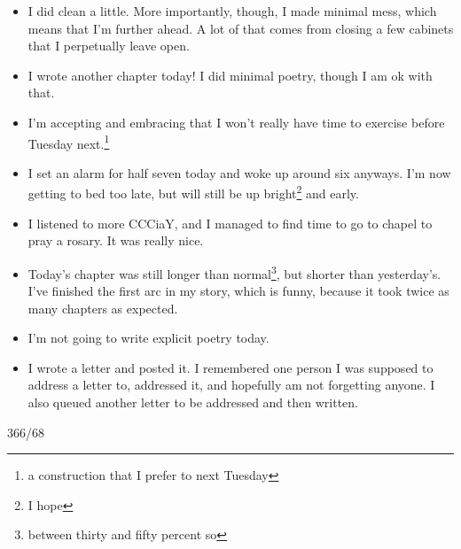 \documentclass[12pt]{article}[titlepage]
\newcommand{\1}{\={a}}
\newcommand{\2}{\={e}}
\newcommand{\3}{\={\i}}
\newcommand{\4}{\=o}
\newcommand{\5}{\=u}
\newcommand{\6}{\={A}}
\renewcommand{\,}{\textsuperscript{,}}
\begin{document}
\begin{itemize}
\item I did clean a little. More importantly, though, I made minimal mess, which means that I'm further ahead. A lot of that comes from closing a few cabinets that I perpetually leave open.
\item I wrote another chapter today! I did minimal poetry, though I am ok with that.
\item I'm accepting and embracing that I won't really have time to exercise before Tuesday next.\footnote{a construction that I prefer to next Tuesday}
\item I set an alarm for half seven today and woke up around six anyways. I'm now getting to bed too late, but will still be up bright\footnote{I hope} and early.
\item I listened to more CCCiaY, and I managed to find time to go to chapel to pray a rosary. It was really nice.
\item Today's chapter was still longer than normal\footnote{between thirty and fifty percent so}, but shorter than yesterday's. I've finished the first arc in my story, which is funny, because it took twice as many chapters as expected.
\item I'm not going to write explicit poetry today.
\item I wrote a letter and posted it. I remembered one person I was supposed to address a letter to, addressed it, and hopefully am not forgetting anyone. I also queued another letter to be addressed and then written.
\end{itemize}

366/68
\end{document}
